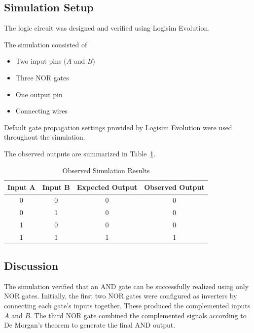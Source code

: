\documentclass[12pt,a4paper]{article}
\begin{document}
\subsection{Simulation Setup}

The logic circuit was designed and verified using Logisim Evolution.

The simulation consisted of

\begin{itemize}
    \item Two input pins ($A$ and $B$)
    \item Three NOR gates
    \item One output pin
    \item Connecting wires
\end{itemize}

Default gate propagation settings provided by Logisim Evolution were used throughout the simulation.



The observed outputs are summarized in Table~\ref{tab:exp03results}.

\begin{table}[H]
\centering
\caption{Observed Simulation Results}
\label{tab:exp03results}
\begin{tabular}{|c|c|c|c|}
\hline
\textbf{Input A} &
\textbf{Input B} &
\textbf{Expected Output} &
\textbf{Observed Output}\\
\hline
0 & 0 & 0 & 0\\
\hline
0 & 1 & 0 & 0\\
\hline
1 & 0 & 0 & 0\\
\hline
1 & 1 & 1 & 1\\
\hline
\end{tabular}
\end{table}

\subsection{Discussion}

The simulation verified that an AND gate can be successfully realized using only NOR gates. Initially, the first two NOR gates were configured as inverters by connecting each gate's inputs together. These produced the complemented inputs $\overline{A}$ and $\overline{B}$. The third NOR gate combined the complemented signals according to De Morgan's theorem to generate the final AND output.
\end{document}
